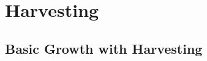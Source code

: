 \documentclass[10pt,letterpaper]{article}
\begin{document}





\section{Harvesting}

\subsection{Basic Growth with Harvesting}
\end{document}
